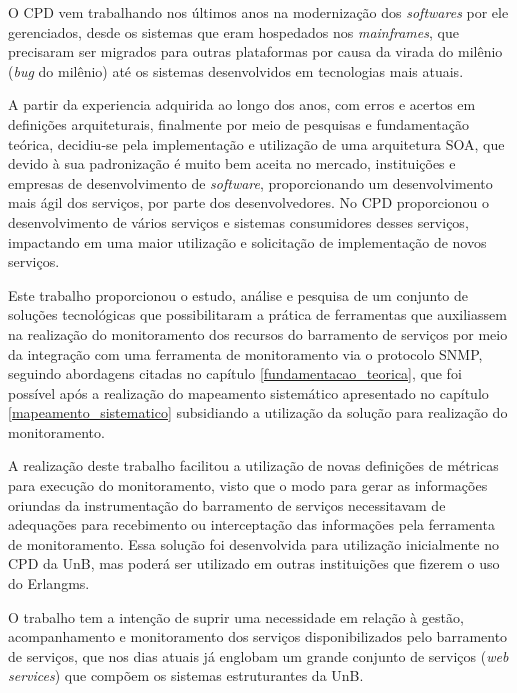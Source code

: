 \label{conclusao}

O \acrshort{CPD} vem trabalhando nos últimos anos na modernização dos \textit{softwares} por ele gerenciados, desde os sistemas que eram hospedados nos \textit{mainframes}, que precisaram ser migrados para outras plataformas por causa da virada do milênio (\textit{bug} do milênio) até os sistemas desenvolvidos em tecnologias mais atuais. 

A partir da experiencia adquirida ao longo dos anos, com erros e acertos em definições arquiteturais, finalmente por meio de pesquisas e fundamentação teórica, decidiu-se pela implementação e utilização de uma arquitetura \acrshort{SOA}, que devido à sua padronização é muito bem aceita no mercado, instituições e empresas de desenvolvimento de \textit{software}, proporcionando um desenvolvimento mais ágil dos serviços, por parte dos desenvolvedores. No \acrshort{CPD} proporcionou o desenvolvimento de vários serviços e sistemas consumidores desses serviços, impactando em uma maior utilização e solicitação de implementação de novos serviços.      

Este trabalho proporcionou o estudo, análise e pesquisa de um conjunto de soluções tecnológicas que possibilitaram a prática de ferramentas que auxiliassem na realização do monitoramento dos recursos do barramento de serviços por meio da integração com uma ferramenta de monitoramento via o protocolo \acrshort{SNMP}, seguindo  abordagens citadas no capítulo \ref{fundamentacao_teorica}, que foi possível após a realização do mapeamento sistemático apresentado no capítulo \ref{mapeamento_sistematico} subsidiando a utilização da solução para realização do monitoramento.  

A realização deste trabalho facilitou a utilização de novas definições de métricas para execução do monitoramento, visto que o modo para gerar as informações oriundas da instrumentação do barramento de serviços necessitavam de adequações para recebimento ou interceptação das informações pela ferramenta de monitoramento. Essa solução foi desenvolvida para utilização inicialmente no \acrshort{CPD} da \acrshort{UnB}, mas poderá ser utilizado em outras instituições que fizerem o uso do Erlangms. 

O trabalho tem a intenção de suprir uma necessidade em relação à gestão, acompanhamento e monitoramento dos serviços disponibilizados pelo barramento de serviços, que nos dias atuais já englobam um grande conjunto de serviços (\textit{web services}) que compõem os sistemas estruturantes da \acrshort{UnB}.


